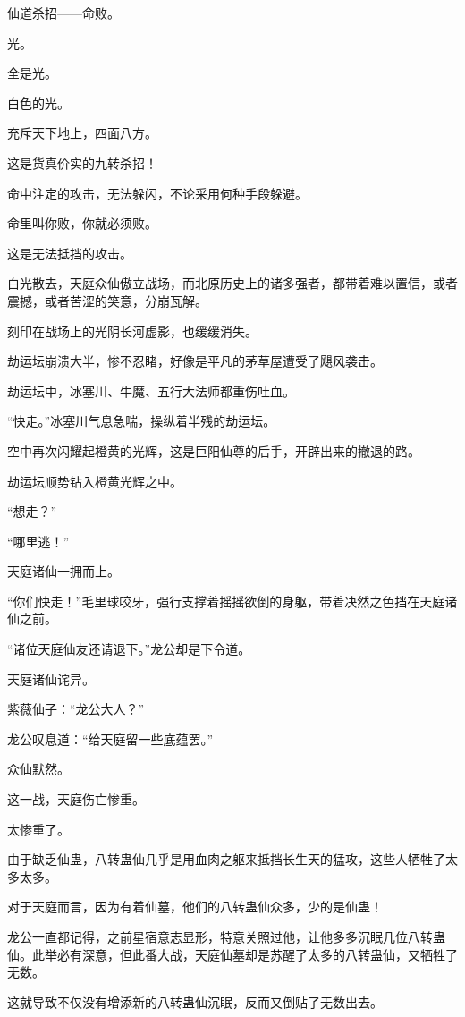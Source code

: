 \begin{this_body}
仙道杀招——命败。

光。

全是光。

白色的光。

充斥天下地上，四面八方。

这是货真价实的九转杀招！

命中注定的攻击，无法躲闪，不论采用何种手段躲避。

命里叫你败，你就必须败。

这是无法抵挡的攻击。

白光散去，天庭众仙傲立战场，而北原历史上的诸多强者，都带着难以置信，或者震撼，或者苦涩的笑意，分崩瓦解。

刻印在战场上的光阴长河虚影，也缓缓消失。

劫运坛崩溃大半，惨不忍睹，好像是平凡的茅草屋遭受了飓风袭击。

劫运坛中，冰塞川、牛魔、五行大法师都重伤吐血。

“快走。”冰塞川气息急喘，操纵着半残的劫运坛。

空中再次闪耀起橙黄的光辉，这是巨阳仙尊的后手，开辟出来的撤退的路。

劫运坛顺势钻入橙黄光辉之中。

“想走？”

“哪里逃！”

天庭诸仙一拥而上。

“你们快走！”毛里球咬牙，强行支撑着摇摇欲倒的身躯，带着决然之色挡在天庭诸仙之前。

“诸位天庭仙友还请退下。”龙公却是下令道。

天庭诸仙诧异。

紫薇仙子：“龙公大人？”

龙公叹息道：“给天庭留一些底蕴罢。”

众仙默然。

这一战，天庭伤亡惨重。

太惨重了。

由于缺乏仙蛊，八转蛊仙几乎是用血肉之躯来抵挡长生天的猛攻，这些人牺牲了太多太多。

对于天庭而言，因为有着仙墓，他们的八转蛊仙众多，少的是仙蛊！

龙公一直都记得，之前星宿意志显形，特意关照过他，让他多多沉眠几位八转蛊仙。此举必有深意，但此番大战，天庭仙墓却是苏醒了太多的八转蛊仙，又牺牲了无数。

这就导致不仅没有增添新的八转蛊仙沉眠，反而又倒贴了无数出去。


\end{this_body}
